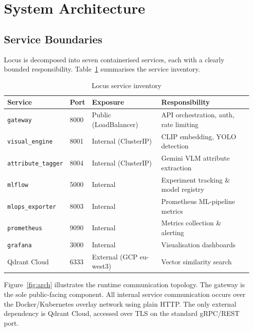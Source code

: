 \documentclass[12pt]{article}
\begin{document}
\section{System Architecture}

\subsection{Service Boundaries}

Locus is decomposed into seven containerised services, each with a clearly bounded responsibility. Table~\ref{tab:services} summarises the service inventory.

\begin{table}[H]
\centering
\small
\begin{tabular}{@{}llll@{}}
\toprule
\textbf{Service} & \textbf{Port} & \textbf{Exposure} & \textbf{Responsibility} \\ \midrule
\texttt{gateway} & 8000 & Public (LoadBalancer) & API orchestration, auth, rate limiting \\
\texttt{visual\_engine} & 8001 & Internal (ClusterIP) & CLIP embedding, YOLO detection \\
\texttt{attribute\_tagger} & 8004 & Internal (ClusterIP) & Gemini VLM attribute extraction \\
\texttt{mlflow} & 5000 & Internal & Experiment tracking \& model registry \\
\texttt{mlops\_exporter} & 8003 & Internal & Prometheus ML-pipeline metrics \\
\texttt{prometheus} & 9090 & Internal & Metrics collection \& alerting \\
\texttt{grafana} & 3000 & Internal & Visualisation dashboards \\ \midrule
Qdrant Cloud & 6333 & External (GCP eu-west3) & Vector similarity search \\ \bottomrule
\end{tabular}
\caption{Locus service inventory}
\label{tab:services}
\end{table}

\noindent Figure~\ref{fig:arch} illustrates the runtime communication topology. The gateway is the sole public-facing component. All internal service communication occurs over the Docker/Kubernetes overlay network using plain HTTP. The only external dependency is Qdrant Cloud, accessed over TLS on the standard gRPC/REST port.
\end{document}
